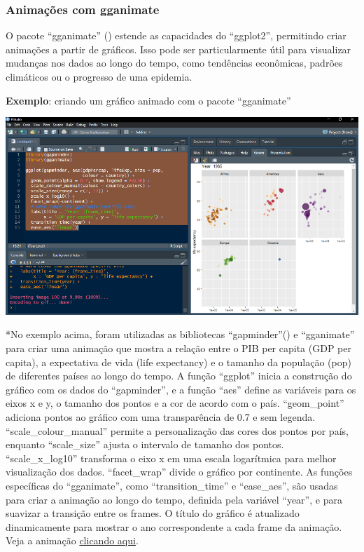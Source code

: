 \documentclass[
]{book}
\begin{document}
\subsubsection{Animações com gganimate}\label{animauxe7uxf5es-com-gganimate}

O pacote ``gganimate'' () estende as capacidades do ``ggplot2'', permitindo criar animações a partir de gráficos. Isso pode ser particularmente útil para visualizar mudanças nos dados ao longo do tempo, como tendências econômicas, padrões climáticos ou o progresso de uma epidemia.

\textbf{Exemplo}: criando um gráfico animado com o pacote ``gganimate''

\includegraphics{images/clipboard-342580043.png}

*No exemplo acima, foram utilizadas as bibliotecas ``gapminder''() e ``gganimate'' para criar uma animação que mostra a relação entre o PIB per capita (GDP per capita), a expectativa de vida (life expectancy) e o tamanho da população (pop) de diferentes países ao longo do tempo. A função ``ggplot'' inicia a construção do gráfico com os dados do ``gapminder'', e a função ``aes'' define as variáveis para os eixos x e y, o tamanho dos pontos e a cor de acordo com o país. ``geom\_point'' adiciona pontos ao gráfico com uma transparência de 0.7 e sem legenda. ``scale\_colour\_manual'' permite a personalização das cores dos pontos por país, enquanto ``scale\_size'' ajusta o intervalo de tamanho dos pontos. ``scale\_x\_log10'' transforma o eixo x em uma escala logarítmica para melhor visualização dos dados. ``facet\_wrap'' divide o gráfico por continente. As funções específicas do ``gganimate'', como ``transition\_time'' e ``ease\_aes'', são usadas para criar a animação ao longo do tempo, definida pela variável ``year'', e para suavizar a transição entre os frames. O título do gráfico é atualizado dinamicamente para mostrar o ano correspondente a cada frame da animação. Veja a animação \href{https://gganimate.com/reference/figures/README-unnamed-chunk-4-1.gif}{clicando aqui}.
\end{document}
